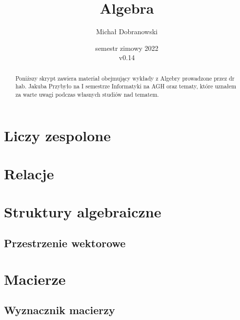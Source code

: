 \documentclass[11pt]{scrartcl}
\title{Algebra}
\author{Michał Dobranowski}
\date{semestr zimowy 2022 \\ v0.14}
\begin{document}
    \maketitle
    \begin{abstract}
        Poniższy skrypt zawiera materiał obejmujący wykłady z Algebry prowadzone przez dr hab. Jakuba Przybyło na I semestrze Informatyki na AGH oraz tematy, które uznałem za warte uwagi podczas własnych studiów nad tematem.
    \end{abstract}
    \tableofcontents
    \eject

    \section{Liczy zespolone}
    

    \section{Relacje}
    

    \section{Struktury algebraiczne}
    

        \subsection{Przestrzenie wektorowe}
        


    \section{Macierze}
    

        \subsection{Wyznacznik macierzy}
        
\end{document}

